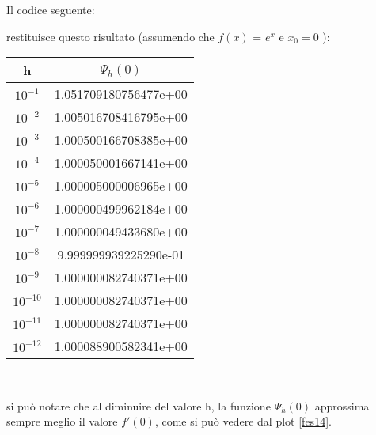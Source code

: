 Il codice seguente:

\newpage
restituisce questo risultato (assumendo che $f(x)$ = $ e^x $ e $ x_0 = 0 $ ): 
\begin{center}
\begin{tabular}{c|c}
h & \( \Psi_{h}(0) \)  \\
\hline
    \(10^{-1}\) & 1.051709180756477e+00\\
    \(10^{-2}\) & 1.005016708416795e+00\\
    \(10^{-3}\) & 1.000500166708385e+00\\
    \(10^{-4}\) & 1.000050001667141e+00\\
    \(10^{-5}\) & 1.000005000006965e+00\\
    \(10^{-6}\) & 1.000000499962184e+00\\
    \(10^{-7}\) & 1.000000049433680e+00\\
    \(10^{-8}\) & 9.999999939225290e-01\\
    \(10^{-9}\) & 1.000000082740371e+00\\
    \(10^{-10}\) & 1.000000082740371e+00\\
    \(10^{-11}\) & 1.000000082740371e+00\\
    \(10^{-12}\) & 1.000088900582341e+00\\
\end{tabular} \\
\end{center}
si può notare che al diminuire del valore h, la funzione \(\Psi_{h}(0)\) approssima sempre meglio il valore $f'(0)$, come si può vedere dal plot \ref{fes14}.